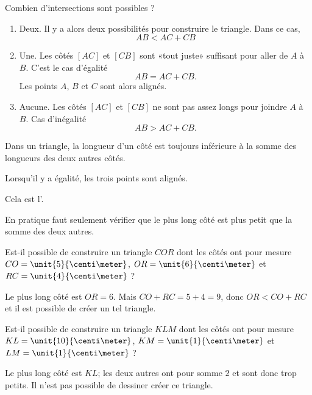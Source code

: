 Combien d'intersections sont possibles ?
\begin{enumerate}
    \item
        Deux. Il y a alors deux possibilités pour construire le triangle. Dans ce cas,
        \begin{equation}
            AB<AC+CB
        \end{equation}
    \item
        Une. Les côtés \( [AC]\) et \( [CB]\) sont «tout juste» suffisant pour aller de \( A\) à \( B\). C'est le cas d'égalité
        \begin{equation}
            AB=AC+CB.
        \end{equation}
        Les points \( A\), \( B\) et \( C\) sont alors alignés.
    \item 
        Aucune. Les côtés \( [AC]\) et \( [CB]\) ne sont pas assez longs pour joindre \( A\) à \( B\). Cas d'inégalité
        \begin{equation}
            AB>AC+CB.
        \end{equation}
\end{enumerate}

\begin{Aretenir}
Dans un triangle, la longueur d'un côté est toujours inférieure à la somme des longueurs des deux autres côtés.

Lorsqu'il y a égalité, les trois points sont alignés.

Cela est l'.
\end{Aretenir}

En pratique faut seulement vérifier que le plus long côté est plus petit que la somme des deux autres.

\begin{example}
    Est-il possible de construire un triangle \( COR\) dont les côtés ont pour mesure \( CO=\unit{5}{\centi\meter}\), \( OR=\unit{6}{\centi\meter}\) et \( RC=\unit{4}{\centi\meter}\) ?

    Le plus long côté est \( OR=6\). Mais \( CO+RC=5+4=9\), donc \( OR<CO+RC\) et il est possible de créer un tel triangle.
\end{example}

\begin{example}
    Est-il possible de construire un triangle \( KLM\) dont les côtés ont pour mesure \( KL=\unit{10}{\centi\meter}\), \( KM=\unit{1}{\centi\meter}\) et \( LM=\unit{1}{\centi\meter}\) ?

    Le plus long côté est \( KL\); les deux autres ont pour somme \( 2\) et sont donc trop petits. Il n'est pas possible de dessiner créer ce triangle.

\begin{center}
   
\end{center}

\end{example}

